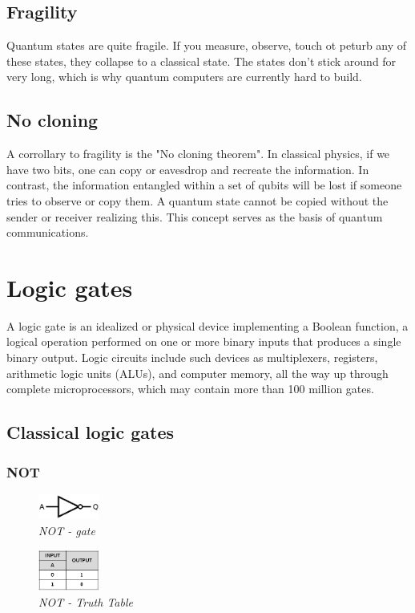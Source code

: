 \documentclass{article}
\begin{document}
\subsection{Fragility}
Quantum states are quite fragile. If you measure, observe, touch ot peturb any of these states, they collapse to a classical state. The states don't stick around for very long, which is why quantum computers are currently hard to build.
\subsection{No cloning}
A corrollary to fragility is the "No cloning theorem". In classical physics, if we have two bits, one can copy or eavesdrop and recreate the information. In contrast, the information entangled within a set of qubits will be lost if someone tries to observe or copy them. A quantum state cannot be copied without the sender or receiver realizing this. This concept serves as the basis of quantum communications.
\newpage
\section{Logic gates}
A logic gate is an idealized or physical device implementing a Boolean function, a logical operation performed on one or more binary inputs that produces a single binary output. 
Logic circuits include such devices as multiplexers, registers, arithmetic logic units (ALUs), and computer memory, all the way up through complete microprocessors, which may contain more than 100 million gates.
\subsection{Classical logic gates}
\subsubsection{NOT}
\begin{figure}[h]
\begin{center}
\begin{minipage}[b]{4cm}
\centering
\includegraphics[width=2cm]{not_gate.png}\\\textit{NOT - gate}
\end{minipage}
\begin{minipage}[b]{2cm}
\centering
\includegraphics[width=2cm]{not_truthtable.png}\\\textit{NOT - Truth Table}
\end{minipage}
\end{center}
\end{figure}
\end{document}
